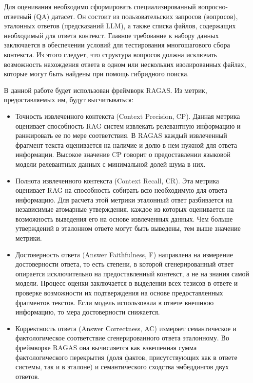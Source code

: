 Для оценивания необходимо сформировать специализированный
вопросно-ответный (QA) датасет.
Он состоит из пользовательских запросов (вопросов), эталонных ответов (предсказаний LLM),
а также списка файлов, содержащих необходимый для ответа контекст.
Главное требование к набору данных заключается в обеспечении
условий для тестирования многошагового сбора контекста.
Из этого следует, что структура вопросов должна исключать
возможность нахождения ответа в одном или нескольких изолированных файлах,
которые могут быть найдены при помощь гибридного поиска.

В данной работе будет использован фреймворк RAGAS.
Из метрик, предоставляемых им, будут высчитываться:

\begin{itemize}
      \item Точность извлеченного контекста (Context Precision, CP).
            Данная метрика оценивает способность RAG систем
            извлекать релевантную информацию и ранжировать ее по мере соответствия.
            В RAGAS каждый извлеченный фрагмент текста оценивается
            на наличие и долю в нем нужной для ответа информации.
            Высокое значение CP говорит о предоставлении языковой модели
            релевантных данных с минимальной долей шума в них.
      \item Полнота извлеченного контекста (Context Recall, CR). Эта метрика оценивает RAG
            на способность собирать всю необходимую для ответа информацию.
            Для расчета этой метрики эталонный ответ
            разбивается на независимые атомарные утверждения, каждое из которых
            оценивается на возможность выведения его на основе извлеченных данных.
            Чем больше утверждений в эталонном ответе могут быть выведены,
            тем выше значение метрики.
      \item Достоверность ответа (Answer Faithfulness, F) направлена на измерение достоверности ответа,
            то есть степени,
            в которой сгенерированный ответ опирается исключительно на предоставленный контекст,
            а не на знания самой модели.
            Процесс оценки заключается в выделении всех тезисов в ответе и проверке
            возможности их подтверждения на основе предоставленных фрагментов текстов.
            Если модель использовала в ответе внешнюю информацию, то мера достоверности снижается.
      \item Корректность ответа (Answer Correctness, AC)
            измеряет семантическое и фактологическое соответствие
            сгенерированного ответа эталонному.
            Во фреймворке RAGAS она вычисляется как взвешенная сумма фактологического перекрытия
            (доля фактов, присутствующих как в ответе системы, так и в эталоне)
            и семантического сходства эмбеддингов двух ответов.
\end{itemize}

